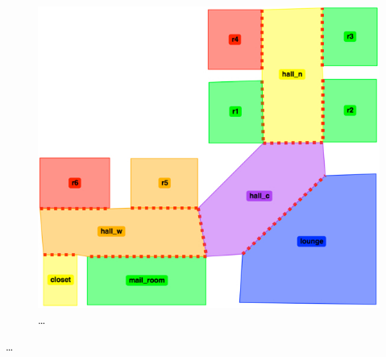 \begin{figure}[h]
	\centering
	\includegraphics[width=0.99\columnwidth, clip]{./img/mailbotMap.jpg}
	\caption{\ldots} %
	\label{Fig:map}
\end{figure}

\ldots

